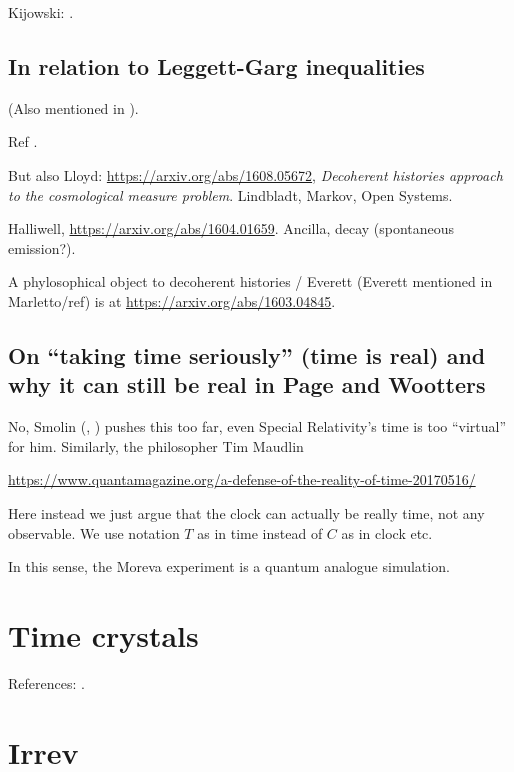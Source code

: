 Kijowski: \cite{Kijowski_Time, Kijowski_Comment}.

\subsection{In relation to Leggett-Garg inequalities}
(Also mentioned in \cite{Moreva_position}).

Ref \cite{LeggettGarg+PageWootters}.

But also Lloyd: \url{https://arxiv.org/abs/1608.05672},
\emph{Decoherent histories approach to the cosmological measure problem}.
Lindbladt, Markov, Open Systems.

Halliwell, \url{https://arxiv.org/abs/1604.01659}. Ancilla, decay (spontaneous emission?).

A phylosophical object to decoherent histories / Everett (Everett mentioned in Marletto/ref)
is at
\url{https://arxiv.org/abs/1603.04845}.



\subsection[On ``taking time seriously'']{On ``taking time seriously'' (time is real) and why it can still be real in Page and Wootters}

No, Smolin
(, )
pushes this too far, even Special Relativity's time is too ``virtual'' for him.
Similarly, the philosopher Tim Maudlin

\url{https://www.quantamagazine.org/a-defense-of-the-reality-of-time-20170516/}

Here instead we just argue that the clock can actually be really time, not any observable.
We use notation $T$ as in time instead of $C$ as in clock etc.

In this sense, the Moreva experiment is a quantum analogue simulation.


\section{Time crystals}

References: \cite{crystal2,crystal3,crystal2012}.


\section{Irrev}

\cite[\s IV. UNBOUNDED-ENERGY CLOCKS?]{Maccone:Pauli}

